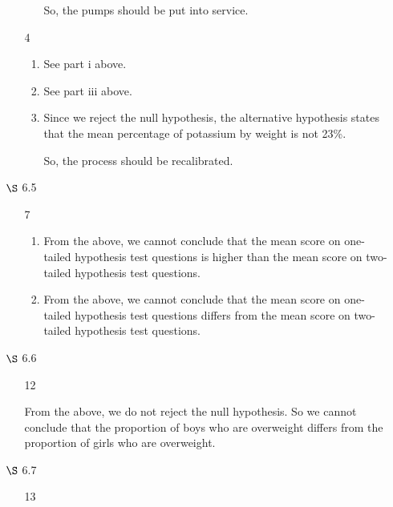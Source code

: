 \documentclass[12pt,letterpaper]{article}
\begin{document}
\begin{enumerate}
\begin{enumerate}
\begin{enumerate}[label=(\arabic*)]
              So, the pumps should be put into service.
          \end{enumerate}
        \item [4]
          \begin{enumerate}[label=(\arabic*)]
            \item See part i above.
            \item See part iii above.
            \item
              Since we reject the null hypothesis,
              the alternative hypothesis states that the mean percentage of potassium by weight is not 23\%.

              So, the process should be recalibrated.
          \end{enumerate}
      \end{enumerate}
    \item [$\S$ 6.5]
      \begin{enumerate}
        \item [7]
          \begin{enumerate}[label=(\arabic*)]
            \item

              From the above,
              we cannot conclude that the mean score on one-tailed hypothesis test questions is higher than the mean score on two-tailed hypothesis test questions.
            \item

              From the above,
              we cannot conclude that the mean score on one-tailed hypothesis test questions differs from the mean score on two-tailed hypothesis test questions.
          \end{enumerate}
      \end{enumerate}
    \item [$\S$ 6.6]
      \begin{enumerate}
        \item [12]

          From the above, we do not reject the null hypothesis.
          So we cannot conclude that the proportion of boys who are overweight differs from the proportion of girls who are overweight.
      \end{enumerate}
    \item [$\S$ 6.7]
      \begin{enumerate}
        \item [13]


\end{enumerate}
\end{enumerate}
\end{document}
